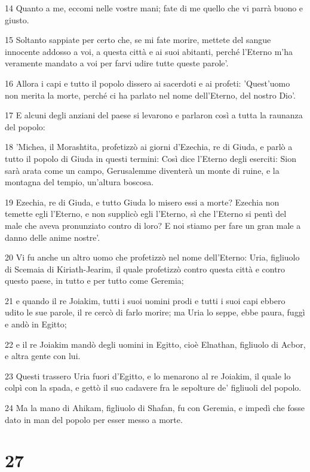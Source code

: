 \par 14 Quanto a me, eccomi nelle vostre mani; fate di me quello che vi parrà buono e giusto.
\par 15 Soltanto sappiate per certo che, se mi fate morire, mettete del sangue innocente addosso a voi, a questa città e ai suoi abitanti, perché l'Eterno m'ha veramente mandato a voi per farvi udire tutte queste parole'.
\par 16 Allora i capi e tutto il popolo dissero ai sacerdoti e ai profeti: 'Quest'uomo non merita la morte, perché ci ha parlato nel nome dell'Eterno, del nostro Dio'.
\par 17 E alcuni degli anziani del paese si levarono e parlaron così a tutta la raunanza del popolo:
\par 18 'Michea, il Morashtita, profetizzò ai giorni d'Ezechia, re di Giuda, e parlò a tutto il popolo di Giuda in questi termini: Così dice l'Eterno degli eserciti: Sion sarà arata come un campo, Gerusalemme diventerà un monte di ruine, e la montagna del tempio, un'altura boscosa.
\par 19 Ezechia, re di Giuda, e tutto Giuda lo misero essi a morte? Ezechia non temette egli l'Eterno, e non supplicò egli l'Eterno, sì che l'Eterno si pentì del male che aveva pronunziato contro di loro? E noi stiamo per fare un gran male a danno delle anime nostre'.
\par 20 Vi fu anche un altro uomo che profetizzò nel nome dell'Eterno: Uria, figliuolo di Scemaia di Kiriath-Jearim, il quale profetizzò contro questa città e contro questo paese, in tutto e per tutto come Geremia;
\par 21 e quando il re Joiakim, tutti i suoi uomini prodi e tutti i suoi capi ebbero udito le sue parole, il re cercò di farlo morire; ma Uria lo seppe, ebbe paura, fuggì e andò in Egitto;
\par 22 e il re Joiakim mandò degli uomini in Egitto, cioè Elnathan, figliuolo di Acbor, e altra gente con lui.
\par 23 Questi trassero Uria fuori d'Egitto, e lo menarono al re Joiakim, il quale lo colpì con la spada, e gettò il suo cadavere fra le sepolture de' figliuoli del popolo.
\par 24 Ma la mano di Ahikam, figliuolo di Shafan, fu con Geremia, e impedì che fosse dato in man del popolo per esser messo a morte.

\chapter{27}

